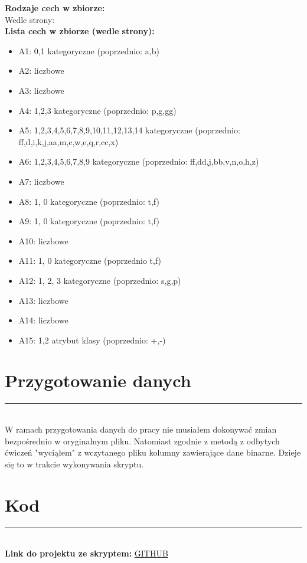 \documentclass[a4paper,12pt]{article}
\newcommand{\linia}{\rule{\linewidth}{0.5pt}}
\theoremstyle{mytheor}
\begin{document}
\textbf{Rodzaje cech w zbiorze:}\\
Wedle strony: \\

\textbf{Lista cech w zbiorze (wedle strony):}
\begin{itemize}
  \item A1: 0,1 kategoryczne (poprzednio: a,b)
  \item A2: liczbowe
  \item A3: liczbowe
  \item A4: 1,2,3 kategoryczne (poprzednio: p,g,gg)
  \item A5: 1,2,3,4,5,6,7,8,9,10,11,12,13,14 kategoryczne (poprzednio: ff,d,i,k,j,aa,m,c,w,e,q,r,cc,x)
  \item A6: 1,2,3,4,5,6,7,8,9 kategoryczne (poprzednio: ff,dd,j,bb,v,n,o,h,z)
  \item A7: liczbowe
  \item A8: 1, 0 kategoryczne (poprzednio: t,f)
  \item A9: 1, 0 kategoryczne (poprzednio: t,f)
  \item A10: liczbowe
  \item A11: 1, 0 kategoryczne (poprzednio t,f)
  \item A12: 1, 2, 3 kategoryczne (poprzednio: s,g,p)
  \item A13: liczbowe
  \item A14: liczbowe
  \item A15: 1,2 atrybut klasy (poprzednio: +,-)
\end{itemize}

\section*{Przygotowanie danych}
\linia\\
 W ramach przygotowania danych do pracy nie musiałem dokonywać zmian bezpośrednio w oryginalnym pliku. Natomiast zgodnie z metodą z odbytych ćwiczeń "wyciąłem" z wczytanego pliku kolumny zawierające dane binarne. Dzieje się to w trakcie wykonywania skryptu.
 
\section*{Kod}
\linia\\
\textbf{Link do projektu ze skryptem:} \textcolor{red}{\href{https://github.com/bvdzynski/up_ai-lab/tree/master/lab8_project_australian}{GITHUB}}\\
\end{document}
